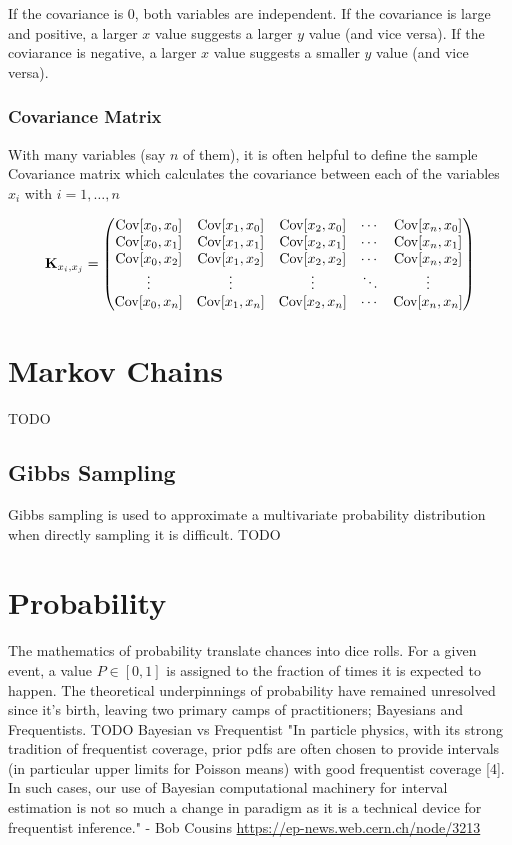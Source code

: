 If the covariance is 0, both variables are independent. If the covariance is large and positive, a larger $x$ value suggests a larger $y$ value (and vice versa). If the coviarance is negative, a larger $x$ value suggests a smaller $y$ value (and vice versa).


\subsubsection{Covariance Matrix}\label{covmat}
With many variables (say $n$ of them), it is often helpful to define the sample Covariance matrix which calculates the covariance between each of the variables $x_i$ with $i = 1,\dots, n$

\begin{align}
\textbf{K}_{x_i,x_j} = \begin{pmatrix} 
                             \mathrm{Cov}[x_0,x_0]&\mathrm{Cov}[x_1,x_0]&\mathrm{Cov}[x_2,x_0]&\cdots &\mathrm{Cov}[x_n,x_0]\\
                             \mathrm{Cov}[x_0,x_1]&\mathrm{Cov}[x_1,x_1]&\mathrm{Cov}[x_2,x_1]&\cdots &\mathrm{Cov}[x_n,x_1]\\
                             \mathrm{Cov}[x_0,x_2]&\mathrm{Cov}[x_1,x_2]&\mathrm{Cov}[x_2,x_2]&\cdots &\mathrm{Cov}[x_n,x_2]\\
                             \vdots&\vdots&\vdots&\ddots&\vdots\\
                             \mathrm{Cov}[x_0,x_n]&\mathrm{Cov}[x_1,x_n]&\mathrm{Cov}[x_2,x_n]&\cdots &\mathrm{Cov}[x_n,x_n] \end{pmatrix}
\end{align}


\label{ch:statistics}

\section{Markov Chains}
TODO

\subsection{Gibbs Sampling}
Gibbs sampling is used to approximate a multivariate probability distribution when directly sampling it is difficult. 
TODO

\section{Probability}
The mathematics of probability translate chances into dice rolls. For a given event, a value $P\in[0,1]$ is assigned to the fraction of times it is expected to happen. The theoretical underpinnings of probability have remained unresolved since it's birth, leaving two primary camps of practitioners; Bayesians and Frequentists.
TODO Bayesian vs Frequentist
"In particle physics, with its strong tradition of frequentist coverage, prior pdfs are often chosen to provide intervals (in particular upper limits for Poisson means) with good frequentist coverage [4]. In such cases, our use of Bayesian computational machinery for interval estimation is not so much a change in paradigm as it is a technical device for frequentist inference." - Bob Cousins \url{https://ep-news.web.cern.ch/node/3213}
